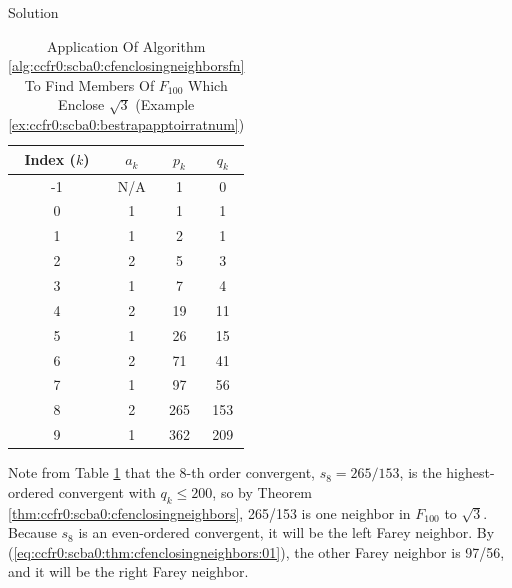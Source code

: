\begin{vworkexampleparsection}{Solution}
\begin{table}
\caption{Application Of Algorithm \ref{alg:ccfr0:scba0:cfenclosingneighborsfn}
         To Find Members Of $F_{100}$ Which Enclose $\sqrt{3}$ 
		 (Example \ref{ex:ccfr0:scba0:bestrapapptoirratnum})}
\label{tbl:ex:ccfr0:scba0:bestrapapptoirratnum}
\begin{center}
\begin{tabular}{|c|c|c|c|}
\hline
\hspace{0.15in}\small{Index ($k$)}\hspace{0.15in} & \hspace{0.15in}\small{$a_k$}\hspace{0.15in}   &
 \hspace{0.15in}\small{$p_k$}\hspace{0.15in}    & \hspace{0.15in}\small{$q_k$}\hspace{0.15in}  \\
\hline
\hline
\small{-1}    & \small{N/A}     & \small{1}        & \small{0}      \\
\hline
\small{0}     & \small{1}       & \small{1}        & \small{1}      \\
\hline
\small{1}     & \small{1}       & \small{2}        & \small{1}      \\ 
\hline
\small{2}     & \small{2}       & \small{5}        & \small{3}      \\ 
\hline
\small{3}     & \small{1}       & \small{7}        & \small{4}      \\
\hline
\small{4}     & \small{2}       & \small{19}       & \small{11}     \\
\hline
\small{5}     & \small{1}       & \small{26}       & \small{15}     \\
\hline
\small{6}     & \small{2}       & \small{71}       & \small{41}     \\
\hline
\small{7}     & \small{1}       & \small{97}       & \small{56}     \\
\hline
\small{8}     & \small{2}       & \small{265}      & \small{153}    \\
\hline
\small{9}     & \small{1}       & \small{362}      & \small{209}    \\
\hline
\end{tabular}
\end{center}
\end{table}

Note from Table \ref{tbl:ex:ccfr0:scba0:bestrapapptoirratnum}
that the 8-th order convergent, $s_8 = 265/153$,
is the highest-ordered convergent with $q_k \leq 200$, so 
by Theorem \ref{thm:ccfr0:scba0:cfenclosingneighbors}, 265/153
is one neighbor in $F_{100}$ to $\sqrt{3}$.  Because $s_8$
is an even-ordered convergent, it will be the left
Farey neighbor.
By (\ref{eq:ccfr0:scba0:thm:cfenclosingneighbors:01}), the
other Farey neighbor is 97/56, and it will be the right
Farey neighbor.
\end{vworkexampleparsection}
\vworkexamplefooter{}


